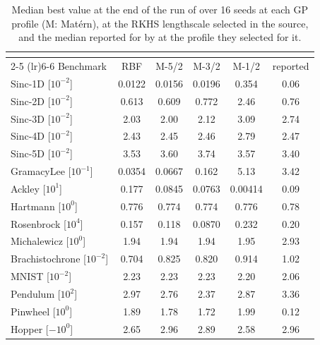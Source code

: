 \begin{table}[t]
\centering
\caption{Median best value at the end of the run of \method{} over 16 seeds at each GP profile (M: Mat\'ern), at the RKHS lengthscale selected in the source, and the median reported for \lzero{} by \citet{sartor2026sparse} at the profile they selected for it.}
\label{tab:profiles}
\footnotesize
\begin{tabular}{lccccc}
\toprule
 & \multicolumn{4}{c}{\method{}} & \lzero{} \\
\cmidrule(lr){2-5} \cmidrule(lr){6-6}
Benchmark & RBF & M-5/2 & M-3/2 & M-1/2 & reported \\
\midrule
Sinc-1D [$10^{-2}$] & 0.0122 & 0.0156 & 0.0196 & 0.354 & 0.06 \\
Sinc-2D [$10^{-2}$] & 0.613 & 0.609 & 0.772 & 2.46 & 0.76 \\
Sinc-3D [$10^{-2}$] & 2.03 & 2.00 & 2.12 & 3.09 & 2.74 \\
Sinc-4D [$10^{-2}$] & 2.43 & 2.45 & 2.46 & 2.79 & 2.47 \\
Sinc-5D [$10^{-2}$] & 3.53 & 3.60 & 3.74 & 3.57 & 3.40 \\
GramacyLee [$10^{-1}$] & 0.0354 & 0.0667 & 0.162 & 5.13 & 3.42 \\
Ackley [$10^{1}$] & 0.177 & 0.0845 & 0.0763 & 0.00414 & 0.09 \\
Hartmann [$10^{0}$] & 0.776 & 0.774 & 0.774 & 0.776 & 0.78 \\
Rosenbrock [$10^{4}$] & 0.157 & 0.118 & 0.0870 & 0.232 & 0.20 \\
Michalewicz [$10^{0}$] & 1.94 & 1.94 & 1.94 & 1.95 & 2.93 \\
Brachistochrone [$10^{-2}$] & 0.704 & 0.825 & 0.820 & 0.914 & 1.02 \\
MNIST [$10^{-2}$] & 2.23 & 2.23 & 2.23 & 2.20 & 2.06 \\
Pendulum [$10^{2}$] & 2.97 & 2.76 & 2.37 & 2.87 & 3.36 \\
Pinwheel [$10^{0}$] & 1.89 & 1.78 & 1.72 & 1.99 & 0.12 \\
Hopper [$-10^{0}$] & 2.65 & 2.96 & 2.89 & 2.58 & 2.96 \\
\bottomrule
\end{tabular}
\end{table}
